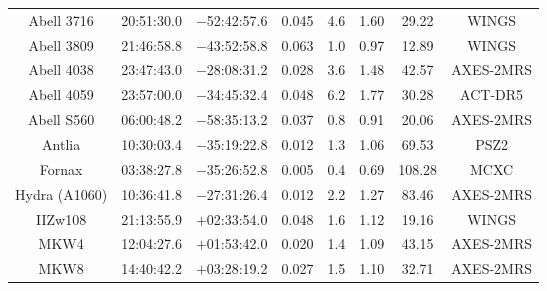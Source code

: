 \begin{table}
\begin{tabular}{cccccccc}
Abell 3716 & 20:51:30.0 & $-$52:42:57.6 & 0.045 & 4.6 & 1.60 & 29.22 & WINGS \\
Abell 3809 & 21:46:58.8 & $-$43:52:58.8 & 0.063 & 1.0 & 0.97 & 12.89 & WINGS \\
Abell 4038 & 23:47:43.0 & $-$28:08:31.2 & 0.028 & 3.6 & 1.48 & 42.57 & AXES-2MRS \\
Abell 4059 & 23:57:00.0 & $-$34:45:32.4 & 0.048 & 6.2 & 1.77 & 30.28 & ACT-DR5 \\
Abell S560 & 06:00:48.2 & $-$58:35:13.2 & 0.037 & 0.8 & 0.91 & 20.06 & AXES-2MRS \\
Antlia & 10:30:03.4 & $-$35:19:22.8 & 0.012 & 1.3 & 1.06 & 69.53 & PSZ2 \\
Fornax & 03:38:27.8 & $-$35:26:52.8 & 0.005 & 0.4 & 0.69 & 108.28 & MCXC \\
Hydra (A1060) & 10:36:41.8 & $-$27:31:26.4 & 0.012 & 2.2 & 1.27 & 83.46 & AXES-2MRS \\
IIZw108 & 21:13:55.9 & $+$02:33:54.0 & 0.048 & 1.6 & 1.12 & 19.16 & WINGS \\
MKW4 & 12:04:27.6 & $+$01:53:42.0 & 0.020 & 1.4 & 1.09 & 43.15 & AXES-2MRS \\
MKW8 & 14:40:42.2 & $+$03:28:19.2 & 0.027 & 1.5 & 1.10 & 32.71 & AXES-2MRS \\
\end{tabular}
\end{table}
